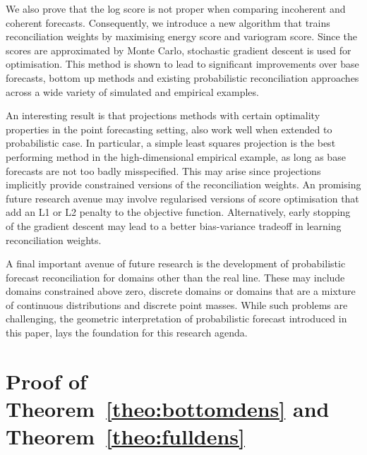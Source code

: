 \documentclass[12pt]{article}
\theoremstyle{definition}
\begin{document}
We also prove that the log score is not proper when comparing incoherent and coherent forecasts.  Consequently, we introduce a new algorithm that trains reconciliation weights by maximising energy score and variogram score.  Since the scores are approximated by Monte Carlo, stochastic gradient descent is used for optimisation.  This method is shown to lead to significant improvements over base forecasts, bottom up methods and existing probabilistic reconciliation approaches across a wide variety of simulated and empirical examples. 

An interesting result is that projections methods with certain optimality properties in the point forecasting setting, also work well when extended to probabilistic case.  In particular, a simple least squares projection is the best performing method in the high-dimensional empirical example, as long as base forecasts are not too badly misspecified.  This may arise since projections implicitly provide constrained versions of the reconciliation weights.  An promising future research avenue may involve regularised versions of score optimisation that add an L1 or L2 penalty to the objective function.  Alternatively, early stopping \citep{BuhYu2003,YaoEtAl2007} of the gradient descent may lead to a better bias-variance tradeoff in learning reconciliation weights.

A final important avenue of future research is the development of probabilistic forecast reconciliation for domains other than the real line.  These may include domains constrained above zero, discrete domains or domains that are a mixture of continuous distributions and discrete point masses.  While such problems are challenging, the geometric interpretation of probabilistic forecast introduced in this paper, lays the foundation for this research agenda.


\newpage

\appendix

\section{Proof of Theorem~\ref{theo:bottomdens} and Theorem~\ref{theo:fulldens}} \label{app:Bottom&FullDens}
\end{document}
